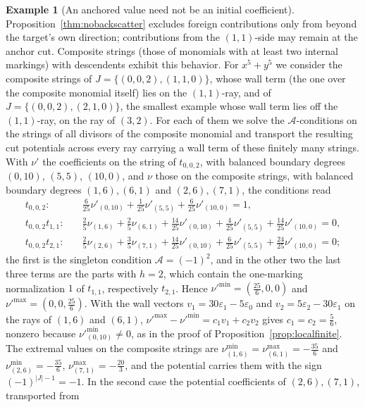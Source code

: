 \documentclass[11pt]{amsart}
\theoremstyle{definition}
\newtheorem{example}[theorem]{Example}
\theoremstyle{remark}
\newcommand{\Ascr}{\mathcal{A}}
\begin{document}
\begin{example}[An anchored value need not be an initial coefficient]
\label{ex:farside}
Proposition~\ref{thm:nobackscatter} excludes foreign contributions only from beyond
the target's own direction; contributions from the $(1,1)$-side may remain at
the anchor cut.  Composite strings (those of monomials with at least two
internal markings) with descendents exhibit this behavior.  For $x^5+y^5$ we
consider the composite strings of $J=\{(0,0,2),(1,1,0)\}$, whose wall
term (the one over the composite monomial itself) lies on the $(1,1)$-ray, and
of $J=\{(0,0,2),(2,1,0)\}$, the smallest example whose wall term lies off the
$(1,1)$-ray, on the ray of $(3,2)$.  For each of them we solve
the $\Ascr$-conditions on the strings of all divisors of the composite
monomial and transport the resulting cut potentials across every ray carrying
a wall term of these finitely many strings.  With $\nu'$ the coefficients on
the string of $t_{0,0,2}$, with balanced boundary degrees $(0,10)$, $(5,5)$,
$(10,0)$, and $\nu$ those on the composite strings, with balanced boundary
degrees $(1,6),(6,1)$ and $(2,6),(7,1)$, the conditions read
\begin{align*}
t_{0,0,2}:&\quad \tfrac6{25}\nu'_{(0,10)}+\tfrac1{25}\nu'_{(5,5)}
+\tfrac6{25}\nu'_{(10,0)}=1,\\
t_{0,0,2}t_{1,1}:&\quad \tfrac25\nu_{(1,6)}+\tfrac25\nu_{(6,1)}
+\tfrac{14}{25}\nu'_{(0,10)}+\tfrac4{25}\nu'_{(5,5)}+\tfrac{14}{25}\nu'_{(10,0)}=0,\\
t_{0,0,2}t_{2,1}:&\quad \tfrac25\nu_{(2,6)}+\tfrac35\nu_{(7,1)}
+\tfrac{14}{25}\nu'_{(0,10)}+\tfrac6{25}\nu'_{(5,5)}+\tfrac{24}{25}\nu'_{(10,0)}=0;
\end{align*}
the first is the singleton condition $\Ascr=(-1)^2$, and in the other two
the last three terms are the parts with $h=2$, which contain the one-marking
normalization $1$ of $t_{1,1}$, respectively $t_{2,1}$.  Hence
$\nu'^{\min}=(\tfrac{25}6,0,0)$ and $\nu'^{\max}=(0,0,\tfrac{25}6)$.  With
the wall vectors $v_1=30\varepsilon_1-5\varepsilon_0$ and
$v_2=5\varepsilon_2-30\varepsilon_1$ on the rays of $(1,6)$ and $(6,1)$,
$\nu'^{\max}-\nu'^{\min}=c_1v_1+c_2v_2$ gives $c_1=c_2=\tfrac56$, nonzero
because $\nu'^{\min}_{(0,10)}\ne0$, as in the proof of
Proposition~\ref{prop:localfinite}.  The extremal values on the composite
strings are $\nu^{\min}_{(1,6)}=\nu^{\max}_{(6,1)}=-\tfrac{35}6$ and
$\nu^{\min}_{(2,6)}=-\tfrac{35}6$, $\nu^{\max}_{(7,1)}=-\tfrac{20}3$, and the
potential carries them with the sign $(-1)^{|J|-1}=-1$.  In the second case
the potential coefficients of $(2,6),(7,1)$, transported from

\end{example}
\end{document}
